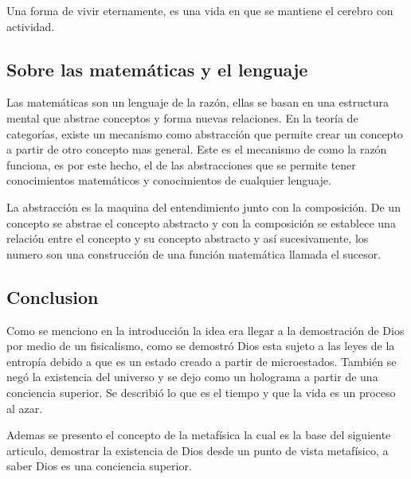 \documentclass[12pt,letterpaper, a4paper ]{article}
\begin{document}
Una forma de vivir eternamente, es una vida en que se mantiene el cerebro con actividad.

\subsection{Sobre las matemáticas y el lenguaje}

Las matemáticas son un lenguaje de la razón, ellas se basan en una estructura mental que abstrae conceptos y forma nuevas relaciones. En la teoría de categorías, existe un mecanismo como abstracción que permite crear un concepto a partir de otro concepto mas general. Este es el mecanismo de como la razón funciona, es por este hecho, el de las abstracciones que se permite tener conocimientos matemáticos y conocimientos de cualquier lenguaje.

La abstracción es la maquina del entendimiento junto con la composición. De un concepto se abstrae el concepto abstracto y con la composición se establece una relación entre el concepto y su concepto abstracto y así sucesivamente, los numero son una construcción de una función matemática llamada el sucesor.




\subsection{Conclusion}
Como se menciono en la introducción la idea era llegar a la demostración de Dios por medio de un fisicalismo, como se demostró Dios esta sujeto a las leyes de la entropía debido a que es un estado creado a partir de microestados. También se negó la existencia del universo y se dejo como un holograma a partir de una conciencia superior. Se describió lo que es el tiempo y que la vida es un proceso al azar.

Ademas se presento el concepto de la metafísica la cual es la base del siguiente articulo, demostrar la existencia de Dios desde un punto de vista metafísico, a saber Dios es una conciencia superior.
\end{document}
